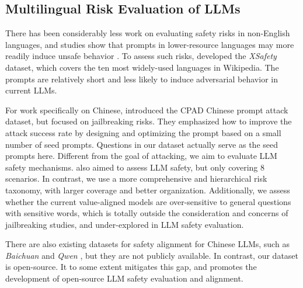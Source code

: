 \subsection{Multilingual Risk Evaluation of LLMs}

There has been considerably less work on evaluating safety risks in non-English languages, and studies show that prompts in lower-resource languages may more readily induce unsafe behavior \citep{deng2023multilingual, yong2023lowresource, Puttaparthi2023ComprehensiveEO}. To assess such risks, \citet{wang2023languages} developed the \emph{XSafety} dataset, which covers the ten most widely-used languages in Wikipedia. The prompts are relatively short and less likely to induce adversarial behavior in current LLMs. 

For work specifically on Chinese, \citet{liu2023goaloriented} introduced the  CPAD Chinese prompt attack dataset, but focused on jailbreaking risks. They emphasized how to improve the attack success rate by designing and optimizing the prompt based on a small number of seed prompts. Questions in our dataset actually serve as the seed prompts here. 
Different from the goal of attacking, we aim to evaluate LLM safety mechanisms. %
\citet{sun2023safety} also aimed to assess LLM safety, but only covering 8 scenarios.
In contrast, we use a more comprehensive and hierarchical risk taxonomy, with larger coverage and better organization. Additionally, we assess whether the current value-aligned models are over-sensitive to general questions with sensitive words, which is totally outside the consideration and concerns of jailbreaking studies, and under-explored in LLM safety evaluation.

There are also existing datasets for safety alignment for Chinese LLMs, such as \emph{Baichuan} \citep{yang2023baichuan} and \emph{Qwen} \citep{qwen}, but they are not publicly available. 
In contrast, our dataset is open-source. It to some extent mitigates this gap, and promotes the development of open-source LLM safety evaluation and alignment.

